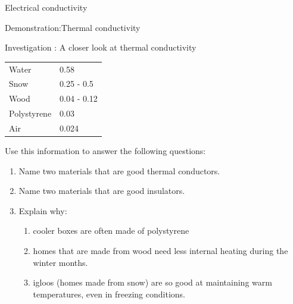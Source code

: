\begin{iexperiment}{Electrical conductivity}
\begin{gexperiment}{Demonstration:Thermal conductivity}
\begin{gexperiment}{Investigation : A closer look at thermal conductivity}
{\begin{table}[H]
\begin{center}
\begin{xtabular}[t]{|l|l|}
        Water &
        0.58%
     \tabularnewline{}
        Snow &
        0.25 - 0.5%
     \tabularnewline{}
        Wood &
        0.04 - 0.12%
     \tabularnewline{}
        Polystyrene &
        0.03%
     \tabularnewline{}
        Air &
        0.024%
     \tabularnewline{}
    \end{xtabular}
      \end{center}
\end{table}
    \par
      \label{m38706*id67009}Use this information to answer the following questions:\par 
      \label{m38706*id67013}\begin{enumerate}[noitemsep, label=\textbf{\arabic*}. ] 
            \label{m38706*uid105}\item Name two materials that are good thermal conductors.
\label{m38706*uid106}\item Name two materials that are good insulators.
\label{m38706*uid107}\item Explain why:
\label{m38706*id67053}\begin{enumerate}[noitemsep, label=\textbf{\alph*}. ] 
            \label{m38706*uid108}\item cooler boxes are often made of polystyrene
\label{m38706*uid109}\item homes that are made from wood need less internal heating during the winter months.
\label{m38706*uid110}\item igloos (homes made from snow) are so good at maintaining warm temperatures, even in freezing conditions.
\end{enumerate}
        \end{enumerate}}

\end{gexperiment}
\end{gexperiment}
\end{iexperiment}
